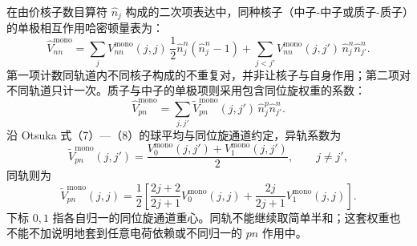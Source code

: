 在由价核子数目算符 $\hat{n}_j$ 构成的二次项表达中，同种核子（中子-中子或质子-质子）的单极相互作用哈密顿量表为：
\begin{equation}\label{eq:2-2-5}
\hat{V}^{\mathrm{mono}}_{nn} = \sum_j V^{\mathrm{mono}}_{nn}(j, j) \, \frac{1}{2} \hat{n}^n_j (\hat{n}^n_j - 1) + \sum_{j < j'} V^{\mathrm{mono}}_{nn}(j, j') \, \hat{n}^n_j \hat{n}^n_{j'}.
\end{equation}
第一项计数同轨道内不同核子构成的不重复对，并非让核子与自身作用；第二项对不同轨道只计一次。质子与中子的单极项则采用包含同位旋权重的系数：
\begin{equation}\label{eq:2-2-6}
\hat{V}^{\mathrm{mono}}_{pn} = \sum_{j, j'} \tilde{V}^{\mathrm{mono}}_{pn}(j, j') \, \hat{n}^p_j \hat{n}^n_{j'}.
\end{equation}
沿 Otsuka 式（7）—（8）的球平均与同位旋通道约定，异轨系数为
\begin{equation}\label{eq:2-2-7}
\tilde V^{\mathrm{mono}}_{pn}(j,j')
=\frac{V^{\mathrm{mono}}_0(j,j')+V^{\mathrm{mono}}_1(j,j')}{2},
\qquad j\ne j',
\end{equation}
同轨则为
\begin{equation}\label{eq:2-2-8}
\tilde V^{\mathrm{mono}}_{pn}(j,j)
=\frac12\left[
\frac{2j+2}{2j+1}V^{\mathrm{mono}}_0(j,j)
+\frac{2j}{2j+1}V^{\mathrm{mono}}_1(j,j)\right].
\end{equation}
下标 $0,1$ 指各自归一的同位旋通道重心。同轨不能继续取简单半和；这套权重也不能不加说明地套到任意电荷依赖或不同归一的 $pn$ 作用中。

